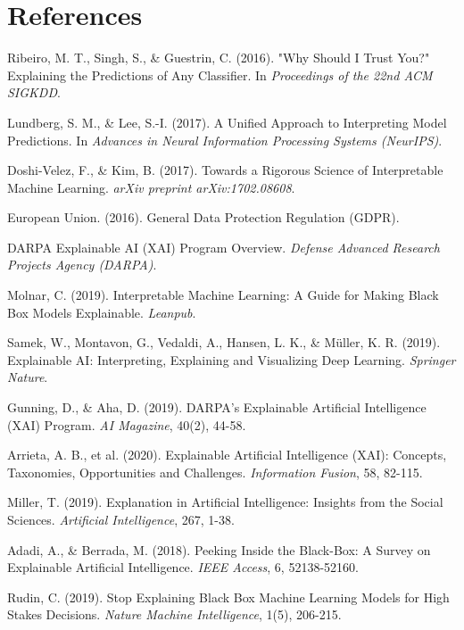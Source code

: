 \documentclass[12pt]{article}
\begin{document}
\section*{References}
\begin{enumerate}[label={[\arabic*]}]
  \item Ribeiro, M. T., Singh, S., \& Guestrin, C. (2016). "Why Should I Trust You?" Explaining the Predictions of Any Classifier. In \textit{Proceedings of the 22nd ACM SIGKDD}.
  \item Lundberg, S. M., \& Lee, S.-I. (2017). A Unified Approach to Interpreting Model Predictions. In \textit{Advances in Neural Information Processing Systems (NeurIPS)}.
  \item Doshi-Velez, F., \& Kim, B. (2017). Towards a Rigorous Science of Interpretable Machine Learning. \textit{arXiv preprint arXiv:1702.08608}.
  \item European Union. (2016). General Data Protection Regulation (GDPR).
  \item DARPA Explainable AI (XAI) Program Overview. \textit{Defense Advanced Research Projects Agency (DARPA)}.
  \item Molnar, C. (2019). Interpretable Machine Learning: A Guide for Making Black Box Models Explainable. \textit{Leanpub}.
  \item Samek, W., Montavon, G., Vedaldi, A., Hansen, L. K., \& Müller, K. R. (2019). Explainable AI: Interpreting, Explaining and Visualizing Deep Learning. \textit{Springer Nature}.
  \item Gunning, D., \& Aha, D. (2019). DARPA's Explainable Artificial Intelligence (XAI) Program. \textit{AI Magazine}, 40(2), 44-58.
  \item Arrieta, A. B., et al. (2020). Explainable Artificial Intelligence (XAI): Concepts, Taxonomies, Opportunities and Challenges. \textit{Information Fusion}, 58, 82-115.
  \item Miller, T. (2019). Explanation in Artificial Intelligence: Insights from the Social Sciences. \textit{Artificial Intelligence}, 267, 1-38.
  \item Adadi, A., \& Berrada, M. (2018). Peeking Inside the Black-Box: A Survey on Explainable Artificial Intelligence. \textit{IEEE Access}, 6, 52138-52160.
  \item Rudin, C. (2019). Stop Explaining Black Box Machine Learning Models for High Stakes Decisions. \textit{Nature Machine Intelligence}, 1(5), 206-215.
\end{enumerate}
\end{document}
